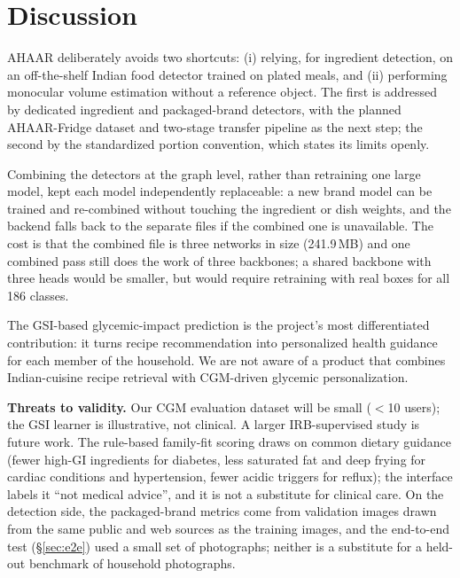 \documentclass[journal]{IEEEtran}
\begin{document}
\section{Discussion}
\label{sec:discussion}

AHAAR deliberately avoids two shortcuts: (i) relying, for ingredient
detection, on an off-the-shelf Indian food detector trained on plated
meals, and (ii) performing monocular volume estimation without a
reference object. The first is addressed by dedicated ingredient and
packaged-brand detectors, with the planned AHAAR-Fridge dataset and
two-stage transfer pipeline as the next step; the second by the
standardized portion convention, which states its limits openly.

Combining the detectors at the graph level, rather than retraining
one large model, kept each model independently replaceable: a new
brand model can be trained and re-combined without touching the
ingredient or dish weights, and the backend falls back to the separate
files if the combined one is unavailable. The cost is that the
combined file is three networks in size (241.9\,MB) and one
combined pass still does the work of three backbones; a shared
backbone with three heads would be smaller, but would require
retraining with real boxes for all 186 classes.

The GSI-based glycemic-impact prediction is the project's most differentiated
contribution: it turns recipe recommendation into personalized
health guidance for each member of the household. We are not aware of a product that combines Indian-cuisine
recipe retrieval with CGM-driven glycemic personalization.

\textbf{Threats to validity.} Our CGM evaluation dataset will be
small ($<$10 users); the GSI learner is illustrative, not clinical.
A larger IRB-supervised study is future work. The rule-based
family-fit scoring draws on common dietary guidance (fewer high-GI
ingredients for diabetes, less saturated fat and deep frying for
cardiac conditions and hypertension, fewer acidic triggers for
reflux); the interface labels it ``not medical advice'', and it is
not a substitute for clinical care. On the detection side, the
packaged-brand metrics come from validation images drawn from the
same public and web sources as the training images, and the
end-to-end test (\S\ref{sec:e2e}) used a small set of photographs;
neither is a substitute for a held-out benchmark of household
photographs.

\end{document}
